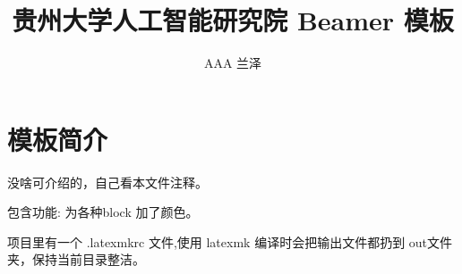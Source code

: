 \documentclass[notheorems,10pt, aspectratio=169]{beamer}
\title{贵州大学人工智能研究院 Beamer 模板}
\subtitle{}
\institute{贵州大学计算机科学与技术学院\\ 贵州大学人工智能研究院 }
\author{AAA 兰泽}
\begin{document}
\begin{frame}
    \titlepage
\end{frame}

\linebg
\begin{frame}
    \tableofcontents[sectionstyle=show,subsectionstyle=show/shaded/hide,subsubsectionstyle=show/shaded/hide]
\end{frame}

\section{模板简介}
\begin{frame}
   没啥可介绍的，自己看本文件注释。

   包含功能: 为各种block 加了颜色。


   项目里有一个 .latexmkrc 文件,使用 latexmk 编译时会把输出文件都扔到 out文件夹，保持当前目录整洁。
\end{frame}
    
   
\end{document}
